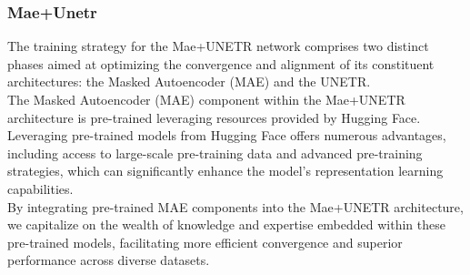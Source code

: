 \subsubsection{Mae+Unetr}
The training strategy for the Mae+UNETR network comprises two distinct phases aimed at optimizing the convergence and alignment of its constituent architectures: the Masked Autoencoder (MAE) and the UNETR.\\

The Masked Autoencoder (MAE) component within the Mae+UNETR architecture is pre-trained leveraging resources provided by Hugging Face. Leveraging pre-trained models from Hugging Face offers numerous advantages, including access to large-scale pre-training data and advanced pre-training strategies, which can significantly enhance the model's representation learning capabilities.\\

By integrating pre-trained MAE components into the Mae+UNETR architecture, we capitalize on the wealth of knowledge and expertise embedded within these pre-trained models, facilitating more efficient convergence and superior performance across diverse datasets.\\

